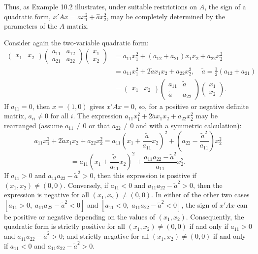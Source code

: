 \begin{original}
Thus, as Example 10.2 illustrates, under suitable restrictions on $A$, the sign of a quadratic form, $x'Ax = a x_1^2 + \hat{a} x_2^2$, may be completely determined by the parameters of the $A$ matrix.

Consider again the two-variable quadratic form:
\begin{align*}
\begin{pmatrix} x_1 & x_2 \end{pmatrix}
\begin{pmatrix} a_{11} & a_{12} \\ a_{21} & a_{22} \end{pmatrix}
\begin{pmatrix} x_1 \\ x_2 \end{pmatrix}
&= a_{11}x_1^2 + (a_{12}+a_{21})x_1x_2 + a_{22}x_2^2 \\
&= a_{11}x_1^2 + 2\tilde{a} x_1x_2 + a_{22}x_2^2, \quad \tilde{a} = \tfrac{1}{2}(a_{12}+a_{21}) \\
&= \begin{pmatrix} x_1 & x_2 \end{pmatrix}
\begin{pmatrix} a_{11} & \tilde{a} \\ \tilde{a} & a_{22} \end{pmatrix}
\begin{pmatrix} x_1 \\ x_2 \end{pmatrix}. \tag{10.1}
\end{align*}
If $a_{11} = 0$, then $x = (1,0)$ gives $x'Ax = 0$, so, for a positive or negative definite matrix, $a_{ii} \neq 0$ for all $i$. The expression $a_{11}x_1^2 + 2\tilde{a}x_1x_2 + a_{22}x_2^2$ may be rearranged (assume $a_{11} \neq 0$ or that $a_{22} \neq 0$ and with a symmetric calculation):
\[
a_{11}x_1^2 + 2\tilde{a}x_1x_2 + a_{22}x_2^2 = a_{11}\left(x_1 + \frac{\tilde{a}}{a_{11}}x_2\right)^2 + \left(a_{22} - \frac{\tilde{a}^2}{a_{11}}\right)x_2^2
\]
\[
= a_{11}\left(x_1 + \frac{\tilde{a}}{a_{11}}x_2\right)^2 + \frac{a_{11}a_{22} - \tilde{a}^2}{a_{11}}x_2^2.
\]
If $a_{11} > 0$ and $a_{11}a_{22} - \tilde{a}^2 > 0$, then this expression is positive if $(x_1, x_2) \neq (0,0)$. Conversely, if $a_{11} < 0$ and $a_{11}a_{22} - \tilde{a}^2 > 0$, then the expression is negative for all $(x_1, x_2) \neq (0,0)$. In either of the other two cases $[a_{11} > 0,\; a_{11}a_{22} - \tilde{a}^2 < 0]$ and $[a_{11} < 0,\; a_{11}a_{22} - \tilde{a}^2 < 0]$, the sign of $x'Ax$ can be positive or negative depending on the values of $(x_1, x_2)$. Consequently, the quadratic form is strictly positive for all $(x_1, x_2) \neq (0,0)$ if and only if $a_{11} > 0$ and $a_{11}a_{22} - \tilde{a}^2 > 0$; and strictly negative for all $(x_1, x_2) \neq (0,0)$ if and only if $a_{11} < 0$ and $a_{11}a_{22} - \tilde{a}^2 > 0$.
\end{original}
